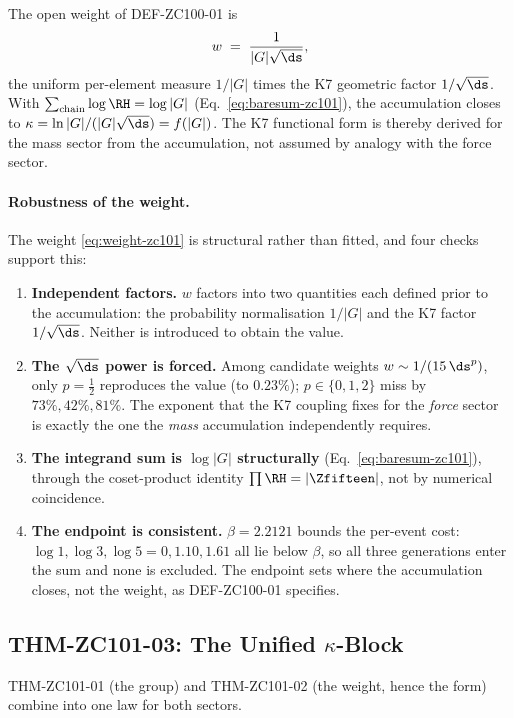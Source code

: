 \documentclass[12pt, a4paper]{article}
\begin{document}
\begin{formalbox}[title={THM-ZC101-02: The Weight Rule}]
The open weight of DEF-ZC100-01 is
\begin{equation*}
  w \;=\; \frac{1}{|G|\sqrt{\ds}},
\end{equation*}
the uniform per-element measure $1/|G|$ times the K7 geometric factor
$1/\sqrt{\ds}$. With $\sum_{\text{chain}}\log\RH=\log|G|$
(Eq.~\ref{eq:baresum-zc101}), the accumulation closes to
$\kappa=\ln|G|/(|G|\sqrt{\ds})=f(|G|)$. The K7 functional form is thereby
derived for the mass sector from the accumulation, not assumed by analogy with
the force sector.
\end{formalbox}

\paragraph{Robustness of the weight.}
The weight \eqref{eq:weight-zc101} is structural rather than fitted, and four checks
support this:
\begin{enumerate}[leftmargin=1.8em, noitemsep]
  \item \textbf{Independent factors.} $w$ factors into two quantities each
    defined prior to the accumulation: the probability normalisation $1/|G|$ and
    the K7 factor $1/\sqrt{\ds}$. Neither is introduced to obtain the value.
  \item \textbf{The $\sqrt{\ds}$ power is forced.} Among candidate weights
    $w\sim 1/(15\,\ds^{p})$, only $p=\tfrac12$ reproduces the value (to
    $0.23\%$); $p\in\{0,1,2\}$ miss by $73\%,42\%,81\%$. The exponent that the
    K7 coupling fixes for the \emph{force} sector is exactly the one the
    \emph{mass} accumulation independently requires.
  \item \textbf{The integrand sum is $\log|G|$ structurally}
    (Eq.~\ref{eq:baresum-zc101}), through the coset-product identity
    $\prod\RH=|\Zfifteen|$, not by numerical coincidence.
  \item \textbf{The endpoint is consistent.} $\beta=2.2121$ bounds the
    per-event cost: $\log 1,\log 3,\log 5=0,1.10,1.61$ all lie below $\beta$, so
    all three generations enter the sum and none is excluded. The endpoint sets
    where the accumulation closes, not the weight, as DEF-ZC100-01 specifies.
\end{enumerate}

\subsection{THM-ZC101-03: The Unified $\kappa$-Block}
THM-ZC101-01 (the group) and THM-ZC101-02 (the weight, hence the form) combine
into one law for both sectors.
\end{document}
